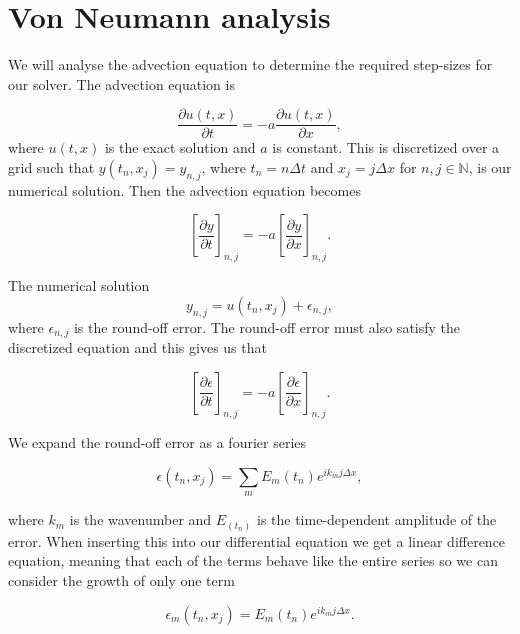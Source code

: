 \documentclass{article}
\begin{document}
\section{Von Neumann analysis}

We will analyse the advection equation to determine the required step-sizes for our solver. The advection equation is

\begin{equation}
    \frac{\partial u(t,x)}{\partial t} = -a \frac{\partial u(t,x)}{\partial x},
\end{equation}
where $u(t,x)$ is the exact solution and $a$ is constant. This is discretized over a grid such that $y(t_n,x_j)=y_{n,j}$, where $t_n = n\Delta t$ and $x_j = j\Delta x$ for $n,j\in\mathbb{N}$, is our numerical solution. Then the advection equation becomes

\begin{equation}
    \left[\frac{\partial y}{\partial t}\right]_{n,j} = -a \left[\frac{\partial y}{\partial x}\right]_{n,j}.
\end{equation}

The numerical solution
\begin{equation}
    y_{n,j} = u(t_n,x_j)+\epsilon_{n,j},
\end{equation}
where $\epsilon_{n,j}$ is the round-off error. The round-off error must also satisfy the discretized equation and this gives us that

\begin{equation}\label{eq:advection_error}
    \left[\frac{\partial \epsilon}{\partial t}\right]_{n,j} = -a \left[\frac{\partial \epsilon}{\partial x}\right]_{n,j}.
\end{equation}

We expand the round-off error as a fourier series

\begin{equation}
    \epsilon(t_n,x_j) = \sum_m E_m(t_n) e^{i k_m j\Delta x},
\end{equation}

where $k_m$ is the wavenumber and $E_(t_n)$ is the time-dependent amplitude of the error. When inserting this into our differential equation we get a linear difference equation, meaning that each of the terms behave like the entire series so we can consider the growth of only one term

\begin{equation}
    \epsilon_m(t_n,x_j) = E_m(t_n) e^{i k_m j\Delta x}.
\end{equation}
\end{document}
